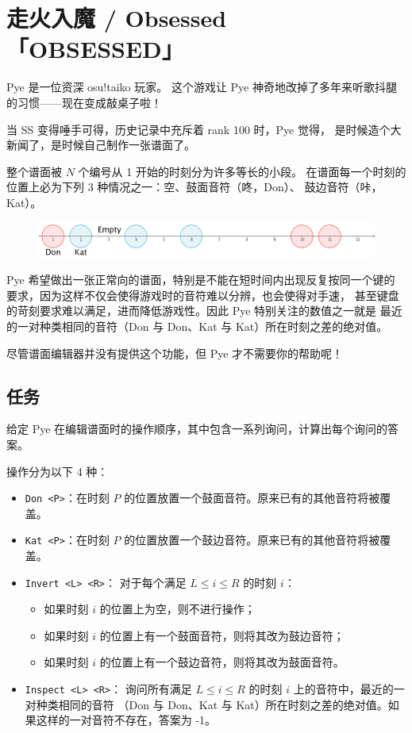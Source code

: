 \documentclass[UTF8, 11pt, a4paper]{article}
\begin{document}
\section*{走火入魔 / Obsessed \makebox[2.5em]{} \small{「OBSESSED」}}
Pye 是一位资深 osu!taiko 玩家。%
这个游戏让 Pye 神奇地改掉了多年来听歌抖腿的习惯——现在变成敲桌子啦！

当 SS 变得唾手可得，历史记录中充斥着 rank 100 时，Pye 觉得，%
是时候造个大新闻了，是时候自己制作一张谱面了。

整个谱面被 $N$ 个编号从 1 开始的时刻分为许多等长的小段。%
在谱面每一个时刻的位置上必为下列 3 种情况之一：空、鼓面音符（咚，Don）、%
鼓边音符（咔，Kat）。

\begin{figure}[h]\centering
\includegraphics[scale=0.2]{desc.png}
\end{figure}

Pye 希望做出一张正常向的谱面，特别是不能在短时间内出现反复按同一个键的%
要求，因为这样不仅会使得游戏时的音符难以分辨，也会使得对手速，%
甚至键盘的苛刻要求难以满足，进而降低游戏性。因此 Pye 特别关注的数值之一就是%
最近的一对种类相同的音符（Don 与 Don、Kat 与 Kat）所在时刻之差的绝对值。

尽管谱面编辑器并没有提供这个功能，但 Pye 才不需要你的帮助呢！

\subsection*{任务}
给定 Pye 在编辑谱面时的操作顺序，其中包含一系列询问，计算出每个询问的答案。


操作分为以下 4 种：
\begin{itemize}
    \item \texttt{Don <P>}：在时刻 $P$ 的位置放置一个鼓面音符。原来已有的其他音符将被覆盖。
    \item \texttt{Kat <P>}：在时刻 $P$ 的位置放置一个鼓边音符。原来已有的其他音符将被覆盖。
    \item \texttt{Invert <L> <R>}：%
        对于每个满足 $L \leq i \leq R$ 的时刻 $i$：
        \begin{itemize}
            \item 如果时刻 $i$ 的位置上为空，则不进行操作；
            \item 如果时刻 $i$ 的位置上有一个鼓面音符，则将其改为鼓边音符；
            \item 如果时刻 $i$ 的位置上有一个鼓边音符，则将其改为鼓面音符。
        \end{itemize}
    \item \texttt{Inspect <L> <R>}：%
        询问所有满足 $L \leq i \leq R$ 的时刻 $i$ 上的音符中，最近的一对种类相同的音符%
        （Don 与 Don、Kat 与 Kat）所在时刻之差的绝对值。如果这样的一对音符不存在，答案为 -1。
\end{itemize}
\end{document}
